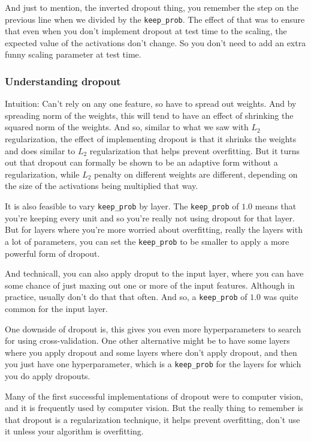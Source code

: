 \documentclass[UTF8]{article}
\begin{document}
And just to mention, the inverted dropout thing, you remember the step on the previous line when we
divided by the \texttt{keep\_prob}. The effect of that was to ensure that even when you don't
implement dropout at test time to the scaling, the expected value of the activations don't change.
So you don't need to add an extra funny scaling parameter at test time.

\subsubsection{Understanding dropout}
Intuition: Can't rely on any one feature, so have to spread out weights. And by spreading norm of
the weights, this will tend to have an effect of shrinking the squared norm of the weights. And so,
similar to what we saw with $L_2$ regularization, the effect of implementing dropout is that it
shrinks the weights and does similar to $L_2$ regularization that helps prevent overfitting.
But it turns out that dropout can formally be shown to be an adaptive form without a regularization,
while $L_2$ penalty on different weights are different, depending on the size of the activations
being multiplied that way.

It is also feasible to vary \texttt{keep\_prob} by layer. The \texttt{keep\_prob} of $1.0$ means
that you're keeping every unit and so you're really not using dropout for that layer. But for
layers where you're more worried about overfitting, really the layers with a lot of parameters, you
can set the \texttt{keep\_prob} to be smaller to apply a more powerful form of dropout.

And technicall, you can also apply droput to the input layer, where you can have some chance of
just maxing out one or more of the input features. Although in practice, usually don't do that that
often. And so, a \texttt{keep\_prob} of $1.0$ was quite common for the input layer.

One downside of dropout is, this gives you even more hyperparameters to search for using
cross-validation. One other alternative might be to have some layers where you apply dropout and
some layers where don't apply dropout, and then you just have one hyperparameter, which is a
\texttt{keep\_prob} for the layers for which you do apply dropouts.

Many of the first successful implementations of dropout were to computer vision, and it is
frequently used by computer vision. But the really thing to remember is that dropout is a
regularization technique, it helps prevent overfitting, don't use it unless your algorithm is
overfitting.
\end{document}
